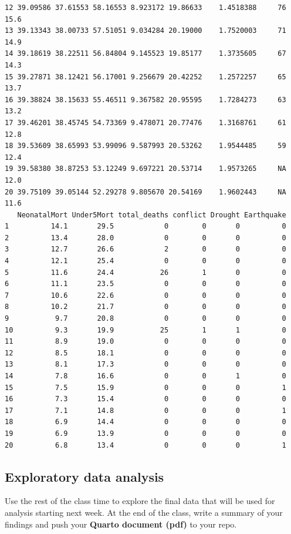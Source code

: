 \documentclass[
  letterpaper,
  DIV=11,
  numbers=noendperiod]{scrartcl}
\begin{document}
\begin{verbatim}
12 39.09586 37.61553 58.16553 8.923172 19.86633    1.4518388     76    15.6
13 39.13343 38.00733 57.51051 9.034284 20.19000    1.7520003     71    14.9
14 39.18619 38.22511 56.84804 9.145523 19.85177    1.3735605     67    14.3
15 39.27871 38.12421 56.17001 9.256679 20.42252    1.2572257     65    13.7
16 39.38824 38.15633 55.46511 9.367582 20.95595    1.7284273     63    13.2
17 39.46201 38.45745 54.73369 9.478071 20.77476    1.3168761     61    12.8
18 39.53609 38.65993 53.99096 9.587993 20.53262    1.9544485     59    12.4
19 39.58380 38.87253 53.12249 9.697221 20.53714    1.9573265     NA    12.0
20 39.75109 39.05144 52.29278 9.805670 20.54169    1.9602443     NA    11.6
   NeonatalMort Under5Mort total_deaths conflict Drought Earthquake
1          14.1       29.5            0        0       0          0
2          13.4       28.0            0        0       0          0
3          12.7       26.6            2        0       0          0
4          12.1       25.4            0        0       0          0
5          11.6       24.4           26        1       0          0
6          11.1       23.5            0        0       0          0
7          10.6       22.6            0        0       0          0
8          10.2       21.7            0        0       0          0
9           9.7       20.8            0        0       0          0
10          9.3       19.9           25        1       1          0
11          8.9       19.0            0        0       0          0
12          8.5       18.1            0        0       0          0
13          8.1       17.3            0        0       0          0
14          7.8       16.6            0        0       1          0
15          7.5       15.9            0        0       0          1
16          7.3       15.4            0        0       0          0
17          7.1       14.8            0        0       0          1
18          6.9       14.4            0        0       0          0
19          6.9       13.9            0        0       0          0
20          6.8       13.4            0        0       0          1
\end{verbatim}

\subsection{Exploratory data analysis}\label{exploratory-data-analysis}

Use the rest of the class time to explore the final data that will be
used for analysis starting next week. At the end of the class, write a
summary of your findings and push your \textbf{Quarto document (pdf)} to
your repo.
\end{document}
